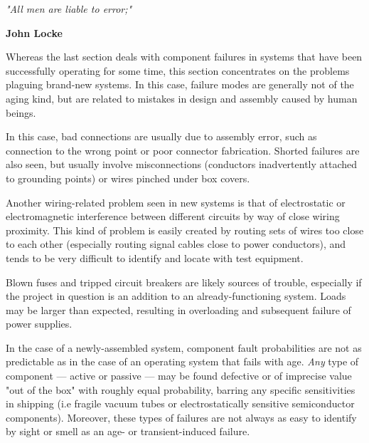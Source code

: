 \stopsubsection

\stopsection

\startsection[title={Likely Failures in Unproven
Systems},reference={sec:xtocid157909719}]

\startblockquote
{\em "All men are liable to error;"}

{\bf John Locke}
\stopblockquote

Whereas the last section deals with component failures in systems that
have been successfully operating for some time, this section
concentrates on the problems plaguing brand-new systems. In this case,
failure modes are generally not of the aging kind, but are related to
mistakes in design and assembly caused by human beings.

\startsubsection[title={Wiring
Problems},reference={sec:xtocid157909720}]

In this case, bad connections are usually due to assembly error, such as
connection to the wrong point or poor connector fabrication. Shorted
failures are also seen, but usually involve misconnections (conductors
inadvertently attached to grounding points) or wires pinched under box
covers.

Another wiring-related problem seen in new systems is that of
electrostatic or electromagnetic interference between different circuits
by way of close wiring proximity. This kind of problem is easily created
by routing sets of wires too close to each other (especially routing
signal cables close to power conductors), and tends to be very difficult
to identify and locate with test equipment.

\stopsubsection

\startsubsection[title={Power Supply
Problems},reference={sec:xtocid157909721}]

Blown fuses and tripped circuit breakers are likely sources of trouble,
especially if the project in question is an addition to an
already-functioning system. Loads may be larger than expected, resulting
in overloading and subsequent failure of power supplies.

\stopsubsection

\startsubsection[title={Defective
Components},reference={sec:xtocid157909722}]

In the case of a newly-assembled system, component fault probabilities
are not as predictable as in the case of an operating system that fails
with age. {\em Any} type of component --- active or passive --- may be
found defective or of imprecise value "out of the box" with roughly
equal probability, barring any specific sensitivities in shipping (i.e
fragile vacuum tubes or electrostatically sensitive semiconductor
components). Moreover, these types of failures are not always as easy to
identify by sight or smell as an age- or transient-induced failure.

